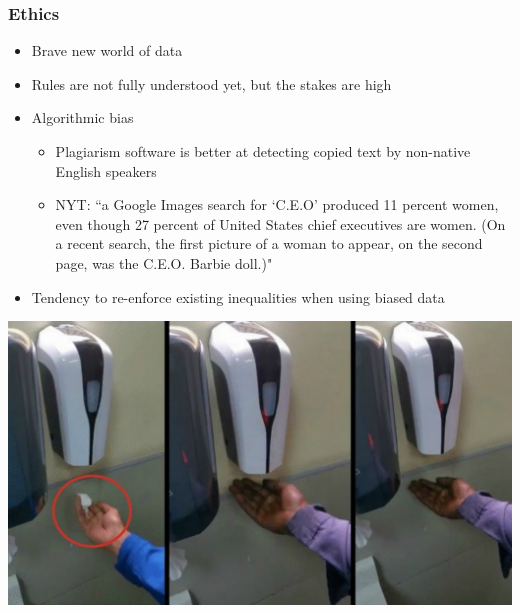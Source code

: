 \documentclass{beamer}
\begin{document}
\begin{frame}
	\frametitle{Ethics}
	
	\begin{itemize}
		\item Brave new world of data\pause
		\item Rules are not fully understood yet, but the stakes are high \pause
		\item Algorithmic bias \pause 
		\begin{itemize}
			\item Plagiarism software is better at detecting copied text by non-native English speakers \pause 
			\item NYT: ``a Google Images search for `C.E.O' produced 11 percent women, even though 27 percent of United States chief executives are women. (On a recent search, the first picture of a woman to appear, on the second page, was the C.E.O. Barbie doll.)" \pause
		\end{itemize}		
		\item Tendency to re-enforce existing inequalities when using biased data			
	\end{itemize}
\end{frame}	

\begin{frame}
	
	\begin{center}

\includegraphics[scale=.2]{figures/racist_soap.jpg}
	\end{center}
	




	
\end{frame}
\end{document}
